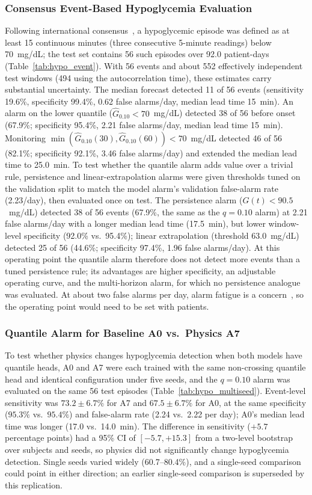 \documentclass[journal]{IEEEtran}
\begin{document}
\subsubsection{Consensus Event-Based Hypoglycemia Evaluation}
Following international consensus~\cite{ref52}, a hypoglycemic episode was defined as at least 15 continuous minutes (three consecutive 5-minute readings) below 70~mg/dL; the test set contains 56 such episodes over 92.0 patient-days (Table~\ref{tab:hypo_event}). With 56 events and about 552 effectively independent test windows (494 using the autocorrelation time), these estimates carry substantial uncertainty. The median forecast detected 11 of 56 events (sensitivity 19.6\%, specificity 99.4\%, 0.62 false alarms/day, median lead time 15~min). An alarm on the lower quantile ($\hat{G}_{0.10} < 70$~mg/dL) detected 38 of 56 before onset (67.9\%; specificity 95.4\%, 2.21 false alarms/day, median lead time 15~min). Monitoring $\min(\hat{G}_{0.10}(30), \hat{G}_{0.10}(60)) < 70$~mg/dL detected 46 of 56 (82.1\%; specificity 92.1\%, 3.46 false alarms/day) and extended the median lead time to 25.0~min. To test whether the quantile alarm adds value over a trivial rule, persistence and linear-extrapolation alarms were given thresholds tuned on the validation split to match the model alarm's validation false-alarm rate (2.23/day), then evaluated once on test. The persistence alarm ($G(t) < 90.5$~mg/dL) detected 38 of 56 events (67.9\%, the same as the $q=0.10$ alarm) at 2.21 false alarms/day with a longer median lead time (17.5~min), but lower window-level specificity (92.0\% vs.\ 95.4\%); linear extrapolation (threshold 63.0~mg/dL) detected 25 of 56 (44.6\%; specificity 97.4\%, 1.96 false alarms/day). At this operating point the quantile alarm therefore does not detect more events than a tuned persistence rule; its advantages are higher specificity, an adjustable operating curve, and the multi-horizon alarm, for which no persistence analogue was evaluated. At about two false alarms per day, alarm fatigue is a concern~\cite{refShivers}, so the operating point would need to be set with patients.

\subsubsection{Quantile Alarm for Baseline A0 vs.\ Physics A7}
\label{sec:quantile_a0_a7}
To test whether physics changes hypoglycemia detection when both models have quantile heads, A0 and A7 were each trained with the same non-crossing quantile head and identical configuration under five seeds, and the $q = 0.10$ alarm was evaluated on the same 56 test episodes (Table~\ref{tab:hypo_multiseed}). Event-level sensitivity was $73.2 \pm 6.7\%$ for A7 and $67.5 \pm 6.7\%$ for A0, at the same specificity ($95.3\%$ vs.\ $95.4\%$) and false-alarm rate (2.24 vs.\ 2.22 per day); A0's median lead time was longer (17.0 vs.\ 14.0~min). The difference in sensitivity ($+5.7$ percentage points) had a 95\% CI of $[-5.7, +15.3]$ from a two-level bootstrap over subjects and seeds, so physics did not significantly change hypoglycemia detection. Single seeds varied widely (60.7--80.4\%), and a single-seed comparison could point in either direction; an earlier single-seed comparison is superseded by this replication.
\end{document}

